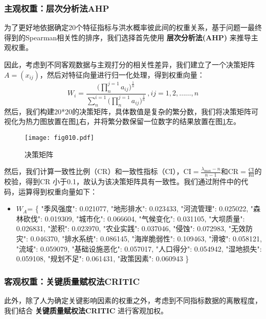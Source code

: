 \documentclass[withoutpreface,bwprint]{cumcmthesis} %
\begin{document}
\subsubsection{主观权重：层次分析法AHP}
为了更好地依据确定20个特征指标与洪水概率彼此间的权重关系，基于问题一最终得到的Spearman相关性的排序，我们选择首先使用 \textbf{层次分析法(AHP)} 来推导主观权重。

因此，考虑到不同客观数据与主观打分的相关性差异，我们建立了一个决策矩阵 $A=(x_{ij})$，然后对特征向量进行归一化处理，得到权重向量：
\begin{equation}
	W_i=\frac{ {(\textstyle \prod_{n}^{j=1}}a_{ij})^{\frac{1}{n} } }{ \sum_{n}^{i=1} {(\textstyle \prod_{n}^{j=1}}a_{ij})^{\frac{1}{n} }}\,,ij=1,2,……,n 
\end{equation}
然后，我们构建20*20的决策矩阵，具体数值是复杂的繁分数，我们将决策矩阵可视化为热力图放置在图\ref{fig010}右，并将繁分数保留一位数字的结果放置在图\ref{fig010}左。

\begin{figure}[htbp]
	\centering
	\texttt{[image: fig010.pdf]}
	\caption{决策矩阵}
	\label{fig010}
\end{figure}
然后，我们计算一致性比例（CR）和一致性指标（CI），$\text{CI} = \frac{\lambda_{\text{max}} - n}{n - 1}$和$\text{CR} = \frac{\text{CI}}{\text{RI}}$的校验，得到CR 小于0.1，故认为该决策矩阵具有一致性。我们通过附件中的代码，运算得到权重向量如下：
\begin{itemize}
\item $W_A$= \{
	"季风强度": 0.021077,
	"地形排水": 0.023433,
	"河流管理": 0.025022,
	"森林砍伐": 0.019309,
	"城市化": 0.066604,
	"气候变化": 0.031105,
	"大坝质量": 0.026831,
	"淤积": 0.023970,
	"农业实践": 0.037046,
	"侵蚀": 0.072983,
	"无效防灾": 0.046370,
	"排水系统": 0.086145,
	"海岸脆弱性": 0.109463,
	"滑坡": 0.058121,
	"流域": 0.059079,
	"基础设施恶化": 0.057017,
	"人口得分": 0.054942,
	"湿地损失": 0.059108,
	"规划不足": 0.061431,
	"政策因素": 0.060943
\}
\end{itemize}
\subsubsection{客观权重：关键质量赋权法CRITIC}
此外，除了人为确定关键影响因素的权重之外，考虑到不同指标数据的离散程度，我们结合 \textbf{关键质量赋权法CRITIC} 进行客观加权。
\end{document}
